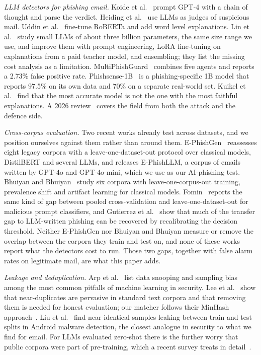 \textit{LLM detectors for phishing email.} Koide et al.~\cite{koide} prompt
GPT-4 with a chain of thought and parse the verdict. Heiding et
al.~\cite{heiding} use LLMs as judges of suspicious mail. Uddin et
al.~\cite{uddin} fine-tune RoBERTa and add word level explanations. Lin et
al.~\cite{lin} study small LLMs of about three billion parameters, the same
size range we use, and improve them with prompt engineering, LoRA fine-tuning
on explanations from a paid teacher model, and ensembling; they list the
missing cost analysis as a limitation. MultiPhishGuard~\cite{multiphish}
combines five agents and reports a 2.73\% false positive rate.
Phishsense-1B~\cite{phishsense} is a phishing-specific 1B model that reports
97.5\% on its own data and 70\% on a separate real-world set. Kuikel et
al.~\cite{kuikel} find that the most accurate model is not the one with the
most faithful explanations. A 2026 review~\cite{survey} covers the field from
both the attack and the defence side.

\textit{Cross-corpus evaluation.} Two recent works already test across
datasets, and we position ourselves against them rather than around them.
E-PhishGen~\cite{ephishgen} reassesses eight legacy corpora with a
leave-one-dataset-out protocol over classical models, DistilBERT and several
LLMs, and releases E-PhishLLM, a corpus of emails written by GPT-4o and
GPT-4o-mini, which we use as our AI-phishing test. Bhuiyan and
Bhuiyan~\cite{bhuiyan} study six corpora with leave-one-corpus-out training,
prevalence shift and artifact learning for classical models. Fomin~\cite{lodo}
reports the same kind of gap between pooled cross-validation and
leave-one-dataset-out for malicious prompt classifiers, and Gutierrez et
al.~\cite{gutierrez} show that much of the transfer gap to LLM-written
phishing can be recovered by recalibrating the decision threshold. Neither
E-PhishGen nor Bhuiyan and Bhuiyan measure or remove the overlap between the
corpora they train and test on, and none of these works report what the
detectors cost to run. Those two gaps, together with false alarm rates on
legitimate mail, are what this paper adds.

\textit{Leakage and deduplication.} Arp et al.~\cite{arp} list data snooping and
sampling bias among the most common pitfalls of machine learning in security.
Lee et al.~\cite{leededup} show that near-duplicates are pervasive in standard
text corpora and that removing them is needed for honest evaluation; our
matcher follows their MinHash approach~\cite{broder}. Liu et
al.~\cite{malwareleak} find near-identical samples leaking between train and
test splits in Android malware detection, the closest analogue in security to
what we find for email. For LLMs evaluated zero-shot there is the further
worry that public corpora were part of pre-training, which a recent survey
treats in detail~\cite{contamsurvey}.

